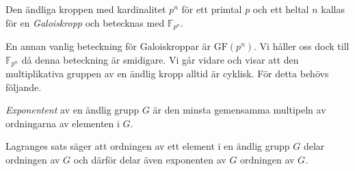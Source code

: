 \documentclass{article}
\theoremstyle{definition}
\begin{document}
\begin{mydef}{}{}
  Den ändliga kroppen med kardinalitet $p^n$ för ett primtal $p$ och ett heltal $n$ kallas för en \textit{Galoiskropp} och betecknas 
  med $\mathbb{F}_{p^n}$.
\end{mydef}
En annan vanlig beteckning för Galoiskroppar är $\text{GF}(p^n)$. Vi håller oss dock till $\mathbb{F}_{p^n}$ då denna beteckning är smidigare.
Vi går vidare och visar att den multiplikativa gruppen av en ändlig kropp alltid är cyklisk. För detta behövs följande.
\begin{mydef}{}{}
  \textit{Exponentent} av en ändlig grupp $G$ är den minsta gemensamma multipeln av ordningarna av elementen i $G$.
\end{mydef}
Lagranges sats säger att ordningen av ett element i en ändlig grupp $G$ delar ordningen av $G$ och därför delar även 
exponenten av $G$ ordningen av $G$.
\end{document}
